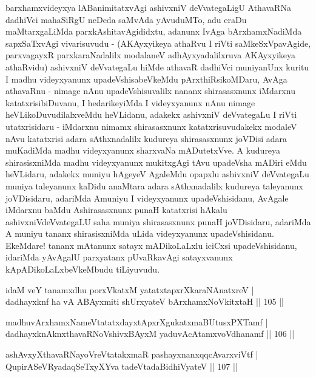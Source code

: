 \begin{artha}
barxhamxvideyxya lABanimitatxvAgi ashivxniV deVvategaLigU AthavaRNa
dadhiVci mahaSiRgU neDeda saMvAda yAvuduMTo, adu eraDu maMtarxgaLiMda
parxkAshitavAgididxtu, adanunx IvAga bArxhamxNadiMda sapxSaTxvAgi
vivarisuvudu - (AKAyxyikeya athaRvu I riVti saMkeSxVpavAgide,
parxvagayxR parxkaraNadalilx modalaneV adhAyxyadalilxruva AKAyxyikeya
athaRvidu)  ashivxniV deVvategaLu hiMde athavaR dadhiVci muniyanUnx
kuritu I madhu videyxyanunx upadeVshisabeVkeMdu pArxthiRsikoMDaru,
AvAga athavaRnu - nimage nAnu upadeVshisuvalilx nananx shirasasxnunx
iMdarxnu katatxrisibiDuvanu, I hedarikeyiMda I videyxyanunx nAnu
nimage heVLikoDuvudilalxveMdu heVLidanu, adakekx ashivxniV deVvategaLu
I riVti utatxrisidaru - iMdarxnu nimamx shirasasxnunx
katatxrisuvudakekx modaleV nAvu katatxrisi adara sAthxnadalilx
kudureya shirasasxnunx joVDisi adara muKadiMda madhu videyxyanunx
sharxvaNa mADutetxVve. A kudureya shirasisxniMda madhu videyxyanunx
mukitxgAgi tAvu upadeVsha mADiri eMdu heVLidaru, adakekx muniyu
hAgeyeV AgaleMdu opapxlu ashivxniV deVvategaLu muniya taleyanunx
kaDidu anaMtara adara sAthxnadalilx kudureya taleyanunx joVDisidaru,
adariMda Amuniyu I videyxyanunx upadeVshisidanu, AvAgale iMdarxnu
baMdu Ashirasasxnunx punaH katatxrisi hAkalu ashivxniVdeVvategaLU saha
muniya shirasasxnunx punaH joVDisidaru, adariMda  A muniyu tananx
shirasisxniMda uLida videyxyanunx upadeVshisidanu. EkeMdare! tananx
mAtanunx satayx mADikoLaLxlu iciCxsi upadeVshisidanu, idariMda
yAvAgalU parxyatanx pUvaRkavAgi satayxvanunx kApADikoLaLxbeVkeMbudu
tiLiyuvudu.
\end{artha}


\begin{shl}
idaM veY tanamxdhu porxVkatxM yatatxtapxrXkaraNAnatxreV |\\
dadhayxknf ha vA ABAyxmiti shUrxyateV bArxhamxNoVkitxtaH \hfill || 105 ||
\end{shl}
\begin{shl}
madhuvArxhamxNameVtatatxdayxtApxrXgukatxmaBUtusxPXTamf |\\
dadhayxknAknxthavaRNoV\s shivxBAyxM yaduvAcA\s \s tamxvoVdhanamf \hfill || 106 ||
\end{shl}

\begin{shl}
ashAvxyXthavaRNayoVreVtatakxmaR pashayxnanxqqcA\s varxviVtf |\\
Qupi\footnotemark[1]rASeVRyadaqSeTxyXYva tadeVtadaBidhiVyateV \hfill || 107 ||
\end{shl}


